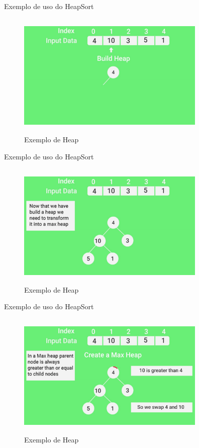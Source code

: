 \begin{frame}
	\begin{block}{Exemplo de uso do HeapSort}
		\begin{figure}[!htb]
			\centering	  				
			\includegraphics[height=6cm, width = 9cm]{./pic/scene005051.jpg}
			\caption{Exemplo de Heap \cite{GEEKS_2018}}
		\end{figure}
	\end{block}
\end{frame}

\begin{frame}
	\begin{block}{Exemplo de uso do HeapSort}
		\begin{figure}[!htb]
			\centering	  				
			\includegraphics[height=6cm, width = 9cm]{./pic/scene007931.jpg}
			\caption{Exemplo de Heap \cite{GEEKS_2018}}
		\end{figure}
	\end{block}
\end{frame}


\begin{frame}
	\begin{block}{Exemplo de uso do HeapSort}
		\begin{figure}[!htb]
			\centering	  				
			\includegraphics[height=6cm, width = 9cm]{./pic/scene01081.jpg}
			\caption{Exemplo de Heap \cite{GEEKS_2018}}
		\end{figure}
	\end{block}
\end{frame}


